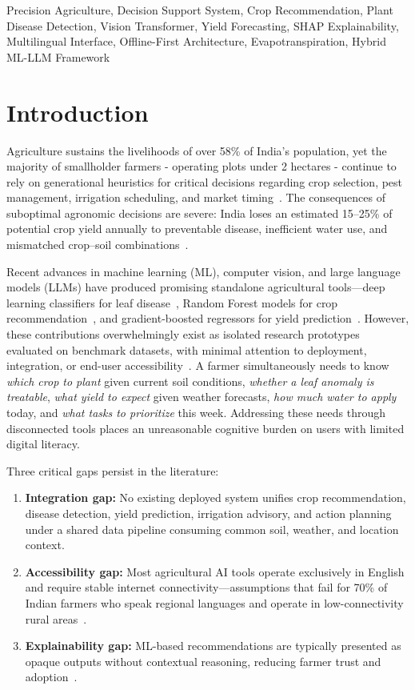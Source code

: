 \documentclass[conference]{IEEEtran}
\begin{document}
\begin{IEEEkeywords}
Precision Agriculture, Decision Support System, Crop Recommendation, Plant Disease Detection, Vision Transformer, Yield Forecasting, SHAP Explainability, Multilingual Interface, Offline-First Architecture, Evapotranspiration, Hybrid ML-LLM Framework
\end{IEEEkeywords}

\section{Introduction}

Agriculture sustains the livelihoods of over 58\% of India's population, yet the majority of smallholder farmers - operating plots under 2 hectares - continue to rely on generational heuristics for critical decisions regarding crop selection, pest management, irrigation scheduling, and market timing~\cite{b1}. The consequences of suboptimal agronomic decisions are severe: India loses an estimated 15--25\% of potential crop yield annually to preventable disease, inefficient water use, and mismatched crop--soil combinations~\cite{b2,b3}.

Recent advances in machine learning (ML), computer vision, and large language models (LLMs) have produced promising standalone agricultural tools---deep learning classifiers for leaf disease~\cite{b12,b13}, Random Forest models for crop recommendation~\cite{b8}, and gradient-boosted regressors for yield prediction~\cite{b6}. However, these contributions overwhelmingly exist as isolated research prototypes evaluated on benchmark datasets, with minimal attention to deployment, integration, or end-user accessibility~\cite{b5}. A farmer simultaneously needs to know \textit{which crop to plant} given current soil conditions, \textit{whether a leaf anomaly is treatable}, \textit{what yield to expect} given weather forecasts, \textit{how much water to apply} today, and \textit{what tasks to prioritize} this week. Addressing these needs through disconnected tools places an unreasonable cognitive burden on users with limited digital literacy.

Three critical gaps persist in the literature:

\begin{enumerate}
    \item \textbf{Integration gap:} No existing deployed system unifies crop recommendation, disease detection, yield prediction, irrigation advisory, and action planning under a shared data pipeline consuming common soil, weather, and location context.
    \item \textbf{Accessibility gap:} Most agricultural AI tools operate exclusively in English and require stable internet connectivity---assumptions that fail for 70\% of Indian farmers who speak regional languages and operate in low-connectivity rural areas~\cite{b4}.
    \item \textbf{Explainability gap:} ML-based recommendations are typically presented as opaque outputs without contextual reasoning, reducing farmer trust and adoption~\cite{b14}.
\end{enumerate}
\end{document}

